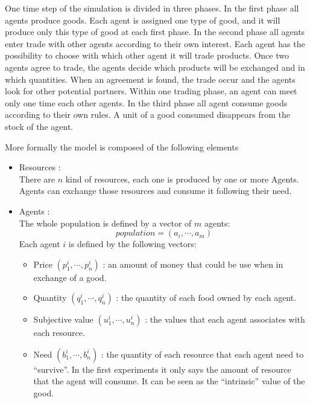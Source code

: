 \documentclass{wscpaperproc}
\begin{document}
One time step of the simulation is divided in three phases. In the first phase all agents produce goods. Each agent is assigned one type of good, and it will produce only this type of good at each first phase. In the second phase all agents enter trade with other agents according to their own interest. Each agent has the possibility to choose with which other agent it will trade products. Once two agents agree to trade, the agents decide which products will be exchanged and in which quantities. When an agreement is found, the trade occur and the agents look for other potential partners. Within one trading phase, an agent can meet only one time each other agents. In the third phase all agent consume goods according to their own rules. A unit of a good consumed disappears from the stock of the agent.


More formally the model is composed of the following elements

\begin{itemize}
	\item Resources :\\
		There are $n$ kind of resources, each one is produced by one or more Agents. Agents can exchange those resources and consume it following their need.
	\item  Agents :\\
		The whole population is defined by a vector of $m$ agents: 
		$$ population= (a_i, \cdots ,a_m) $$
		Each agent $i$ is defined by the following vectors:
		\begin{itemize}
			\item Price $(p^i_1,\cdots,p^i_n)$ : an amount of money that could be use when in exchange of a good.
			\item Quantity $(q^i_1,\cdots,q^i_n)$ : the quantity of each food owned by each agent.
			\item Subjective value $(u^i_1,\cdots,u^i_n)$ : the values that each agent associates with each resource.
			\item Need $(b^i_1, \cdots, b^i_n)$ :  the quantity of each resource that each agent need to ``survive''. In the first experiments it only says the amount of resource that the agent will consume. It can be seen as the ``intrinsic'' value of the good.
		\end{itemize}
\end{itemize}
\end{document}
